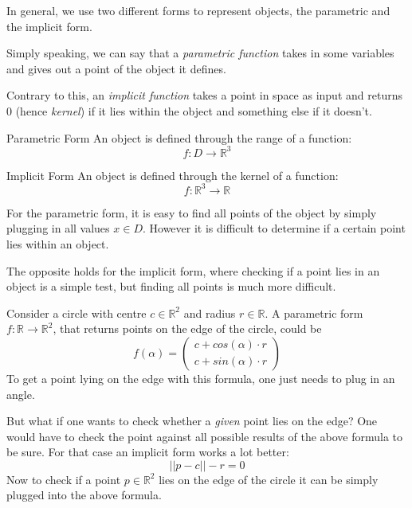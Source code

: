 \documentclass[english]{panikzettel}
\begin{document}
\begin{halfboxl}
In general, we use two different forms to represent objects, the parametric and the implicit form.

Simply speaking, we can say that a \textit{parametric function} takes in some variables and gives out a point of the object it defines.

Contrary to this, an \textit{implicit function} takes a point in space as input and returns $0$ (hence \emph{kernel}) if it lies within the object and something else if it doesn't.
\end{halfboxl}%
\begin{halfboxr}
\vspace{-\baselineskip}
\begin{defi}{Parametric Form}
An object is defined through the range of a function: $$f : D \to \mathbb{R}^3 $$
\end{defi}

\begin{defi}{Implicit Form}
An object is defined through the kernel of a function: $$f: \mathbb{R}^3 \to \mathbb{R}$$
\end{defi}
\end{halfboxr}
For the parametric form, it is easy to find all points of the object by simply plugging in all values $x \in D$. However it is difficult to determine if a certain point lies within an object.

The opposite holds for the implicit form, where checking if a point lies in an object is a simple test, but finding all points is much more difficult.


Consider a circle with centre $c \in \mathbb{R}^2$ and radius $r \in \mathbb{R}$.
A parametric form $f: \mathbb{R} \to \mathbb{R}^2$, that returns points on the edge of the circle, could be
\[
    f(\alpha) = \begin{pmatrix} c + cos(\alpha) \cdot r \\ c + sin(\alpha) \cdot r \end{pmatrix}
\]
To get a point lying on the edge with this formula, one just needs to plug in an angle.

But what if one wants to check whether a \emph{given} point lies on the edge? One would have to check the point against all possible results of the above formula to be sure. For that case an implicit form works a lot better:
\[
    ||p - c|| - r = 0
\]
Now to check if a point $p \in \mathbb{R}^2$ lies on the edge of the circle it can be simply plugged into the above formula.
\end{document}
